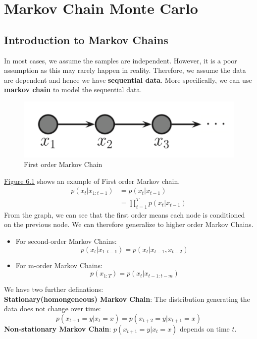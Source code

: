 \section{Markov Chain Monte Carlo}
\subsection{Introduction to Markov Chains}
In most cases, we assume the samples are independent. However, it is a poor assumption as this may rarely happen in reality. Therefore, we assume the data are dependent and hence we have \textbf{sequential data}. More specifically, we can use \textbf{markov chain} to model the sequential data.
\begin{figure}[H]
    \centering
    \includegraphics[width = .6\linewidth]{codes/figures/section6/figure_6_1.png}
    \caption{First order Markov Chain}
    \label{fig:f_mc}
\end{figure}
\hyperref[fig:f_mc]{Figure 6.1} shows an example of First order Markov chain.
\begin{align*} 
    p\left(x_t | x_{1: t-1}\right)&=p\left(x_t | x_{t-1}\right)\\
    &=\prod_{t=1}^T p\left(x_t | x_{t-1}\right)
\end{align*}
From the graph, we can see that the first order means each node is conditioned on the previous node. We can therefore generalize to higher order Markov Chains.
\begin{itemize}    \item For second-order Markov Chains:
    $$p\left(x_t | x_{1: t-1}\right)=p\left(x_t | x_{t-1},x_{t-2}\right)$$
    \item For m-order Markov Chains:
    $$p\left(x_{1: T}\right)=p\left(x_t | x_{t-1:t-m}\right)$$
\end{itemize}
We have two further definations:\\
\textbf{Stationary(homongeneous) Markov Chain}: The distribution generating the data does not change over time:
$$p(x_{t+1}=y|x_t=x)=p(x_{t+2}=y|x_{t+1}=x)$$ 
\textbf{Non-stationary Markov Chain}: $p(x_{t+1}=y|x_t=x)$ depends on time $t$.

